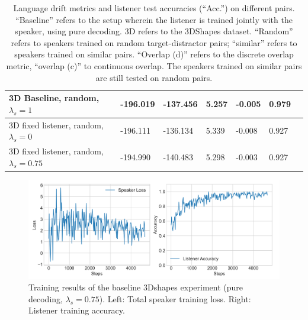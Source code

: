 \begin{table}[]
\begin{tabularx}{\textwidth}{|X|l|l|X|X|X|X|}
		3D Baseline, random, $\lambda_s = 1$   &      -196.019             &            -137.456             &        5.257              &          -0.005            &              0.979                            &                                           \\ \hline
		3D fixed listener, random, $\lambda_s = 0$&      -196.111          &     -136.134                  &             5.339         &         -0.008            &                   0.927                      &                                           \\ \hline
		3D fixed listener, random, $\lambda_s = 0.75$&      -194.990          &     -140.483                  &             5.298         &         -0.003            &                   0.927                      &                                           \\ \hline
	\end{tabularx}
	\caption{\label{tab:3dshapes_drift_metrics_basic_baseline} Language drift metrics and listener test accuracies (``Acc.'') on different pairs. 
		``Baseline'' refers to the setup wherein the listener is trained jointly with the speaker, using pure decoding. 3D refers to the 3DShapes dataset. ``Random'' refers to speakers trained on random target-distractor pairs; ``similar'' refers to speakers trained on similar pairs. ``Overlap (d)'' refers to the discrete overlap metric, ``overlap (c)'' to continuous overlap. The speakers trained on similar pairs are still tested on random pairs.}
\end{table}

\begin{figure}[h]
	\centering
	\includegraphics[width=\linewidth]{images/3dshapes_refgame_49_pure_075.png}
	\caption{Training results of the baseline 3Dshapes experiment (pure decoding, $\lambda_s = 0.75$). Left: Total speaker training loss. Right: Listener training accuracy.}
	\label{fig:3dshapes_baseline_075_speaker_loss_listener_acc}
\end{figure}

